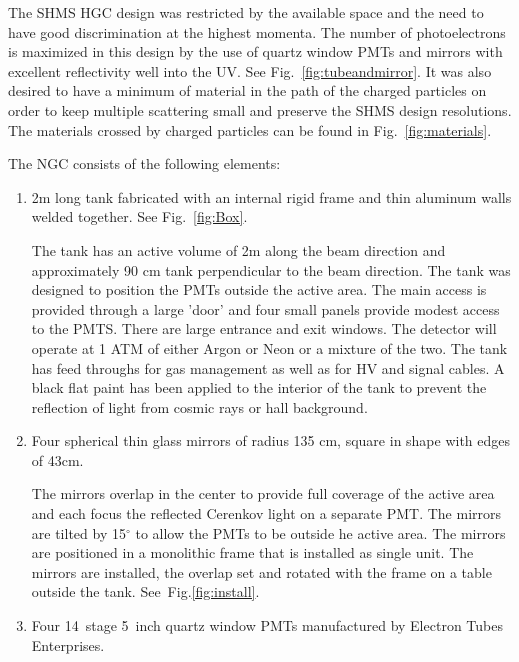 {The SHMS HGC design was restricted by the available space and the need
to have good discrimination at the highest momenta.  The number of
photoelectrons is maximized in this design by the use of quartz window
PMTs and mirrors with excellent reflectivity well into the UV. See
Fig.~\ref{fig:tubeandmirror}. It was also desired to have a minimum of
material in the path of the charged particles on order to keep
multiple scattering small and preserve the SHMS design
resolutions. The materials crossed by charged particles can be found
in Fig.~\ref{fig:materials}.

\newpage
\vspace{.25in}
\vspace{.25in}

The NGC consists of the following elements:
\begin{enumerate}
\item 2m long tank fabricated with an internal rigid frame and thin
  aluminum walls welded together. See Fig.~\ref{fig:Box}.

 The tank has an active volume of 2m along the beam direction and
 approximately 90 cm tank perpendicular to the beam direction. The
 tank was designed to position the PMTs outside the active area. The
 main access is provided through a large 'door' and four small panels
 provide modest access to the PMTS. There are large entrance and exit
 windows. The detector will operate at 1 ATM of either Argon or Neon
 or a mixture of the two. The tank has feed throughs for gas
 management as well as for HV and signal cables. A black flat paint
 has been applied to the interior of the tank to prevent the
 reflection of light from cosmic rays or hall background.

\item Four spherical thin glass mirrors of radius 135 cm, square in
  shape with edges of 43cm.

  The mirrors overlap in the center to provide full coverage of the
  active area and each focus the reflected Cerenkov light on a
  separate PMT. The mirrors are tilted by 15$^\circ$ to allow the PMTs
  to be outside he active area.  The mirrors are positioned in a
  monolithic frame that is installed as single unit. The mirrors are
  installed, the overlap set and rotated with the frame on a table
  outside the tank.  See~Fig.\ref{fig:install}.
\item Four 14~stage 5~inch quartz window PMTs manufactured by Electron
  Tubes Enterprises.


\end{enumerate}}
